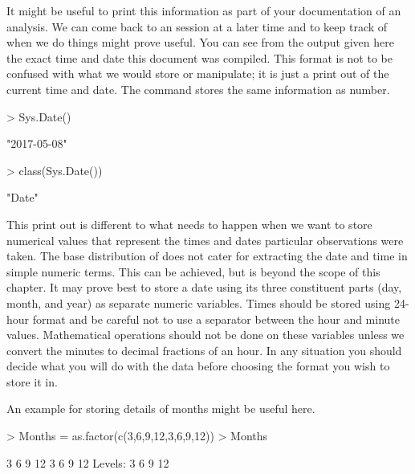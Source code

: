 It might be useful to print this information as part of your documentation of an analysis. We can come back to an \R{} session at a later time and to keep track of when we do things might prove useful. You can see from the output given here the exact time and date this document was compiled. This format is not to be confused with what we would store or manipulate; it is just a print out of the current time and date. The  command stores the same information as number. 

\begin{Schunk}
\begin{Sinput}
> Sys.Date() 
\end{Sinput}
\begin{Soutput}
[1] "2017-05-08"
\end{Soutput}
\begin{Sinput}
> class(Sys.Date()) 
\end{Sinput}
\begin{Soutput}
[1] "Date"
\end{Soutput}
\end{Schunk}

 
This print out is different to what needs to happen when we want to store numerical values that represent the times and dates particular observations were taken. The base distribution of \R{} does not cater for extracting the date and time in simple numeric terms. This can be achieved, but is beyond the scope of this chapter. It may prove best to store a date using its three constituent parts (day, month, and year) as separate numeric variables. Times should be stored using 24-hour format and be careful not to use a separator between the hour and minute values. Mathematical operations should not be done on these variables unless we convert the minutes to decimal fractions of an hour. In any situation you should decide what you will do with the data before choosing the format you wish to store it in. 
 
An example for storing details of months might be useful here. 

\begin{Schunk}
\begin{Sinput}
> Months = as.factor(c(3,6,9,12,3,6,9,12)) 
> Months 
\end{Sinput}
\begin{Soutput}
[1] 3  6  9  12 3  6  9  12
Levels: 3 6 9 12
\end{Soutput}
\end{Schunk}

